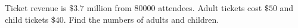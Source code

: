Ticket revenue is $\$3.7$ million from $80000$ attendees. Adult tickets cost $\$50$ and child tickets $\$40$. Find the numbers of adults and children.
